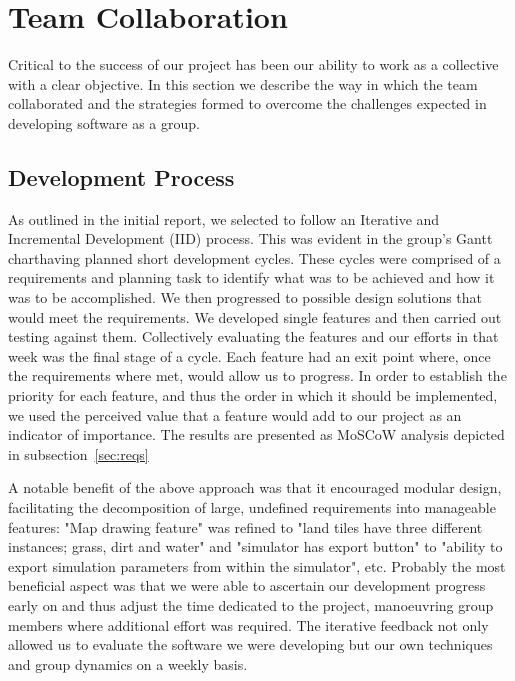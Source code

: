 \section{Team Collaboration}
\label{sec:team_work}
Critical to the success of our project has been our ability to work as a collective with a clear objective. In this section we describe the way in which the team collaborated and the strategies formed to overcome the challenges expected in developing software as a group.

\subsection{Development Process}\label{ss:dev-process}
As outlined in the initial report, we selected to follow an Iterative and Incremental Development (IID) process. This was evident in the group's Gantt chart\footnotemark[01] having planned short development cycles. These cycles were comprised of a requirements and planning task to identify what was to be achieved and how it was to be accomplished. We then progressed to possible design solutions that would meet the requirements. We developed single features and then carried out testing against them. Collectively evaluating the features and our efforts in that week was the final stage of a cycle. Each feature had an exit point where, once the requirements where met, would allow us to progress. In order to establish the priority for each feature, and thus the order in which it should be implemented, we used the perceived value that a feature would add to our project as an indicator of importance. The results are presented as MoSCoW analysis depicted in subsection~\ref{sec:reqs}

A notable benefit of the above approach was that it encouraged modular design, facilitating the decomposition of large, undefined requirements into manageable features: "Map drawing feature" was refined to "land tiles have three different instances; grass, dirt and water" and "simulator has export button" to "ability to export simulation parameters from within the simulator", etc.  
Probably the most beneficial aspect was that we were able to ascertain our development progress early on and thus adjust the time dedicated to the project, manoeuvring group members where additional effort was required. The iterative feedback not only allowed us to evaluate the software we were developing but our own techniques and group dynamics on a weekly basis.

